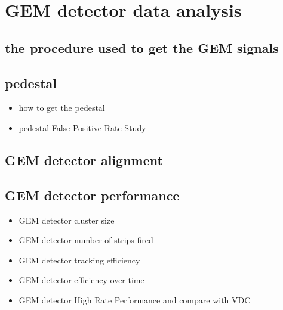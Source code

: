 \section{GEM detector data analysis}
\subsection{the procedure used to get the GEM signals}
\subsection{pedestal}
\begin{itemize}
    \item how to get the pedestal
    \item pedestal False Positive Rate Study
\end{itemize}
\subsection{GEM detector alignment}
\subsection{GEM detector performance}
\begin{itemize}
    \item GEM detector cluster size
    \item GEM detector number of strips fired
    \item GEM detector tracking efficiency
    \item GEM detector efficiency over time 
    \item GEM detector High Rate Performance and compare with VDC 
\end{itemize}
